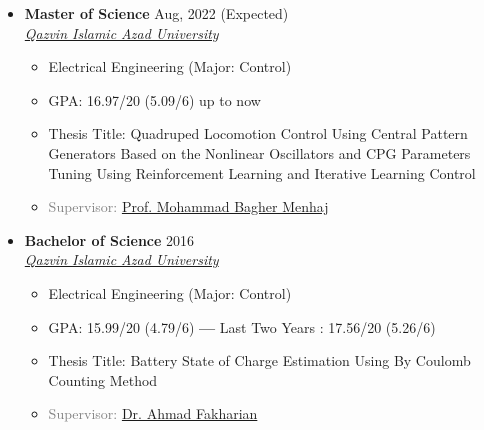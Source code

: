 \documentclass[10pt,a4paper,sans]{moderncv} %
\begin{document}
	\begin{itemize}[nosep]
		\item \textbf{Master of Science} \hfill Aug, 2022 (Expected)  \\ 
		\href{http://qiau.ac.ir/en/}{ \emph{Qazvin Islamic Azad University}} \hfill%
		
		\begin{itemize}[nosep, leftmargin=0.9cm ] %
			\item Electrical Engineering (Major: Control) %
	        \item GPA: 16.97/20 (5.09/6) up to now %
			\item Thesis Title: Quadruped Locomotion Control Using Central Pattern Generators Based on the Nonlinear Oscillators and CPG Parameters Tuning Using Reinforcement Learning and Iterative Learning Control %
			\item \textcolor{gray}{Supervisor: \href{https://scholar.google.com/citations?user=0EN-JbQAAAAJ}{Prof. Mohammad Bagher Menhaj}}
		\end{itemize}
		
		\vspace{1em}
		
		\item \textbf{Bachelor of Science} \hfill 2016 \\
		\href{http://qiau.ac.ir/en/}{ \emph{Qazvin Islamic Azad University}} \hfill %
		\begin{itemize}[nosep, leftmargin=0.9cm ]
			\item Electrical Engineering (Major: Control)
			\item GPA: 15.99/20 (4.79/6) %
			\textbf{---} Last Two Years : 17.56/20 (5.26/6) %
			\item Thesis Title: Battery State of Charge Estimation Using By Coulomb Counting Method %
			\item \textcolor{gray}{Supervisor: \href{https://scholar.google.com/citations?user=bI_eOLAAAAAJ}{Dr. Ahmad Fakharian}}
		\end{itemize}
	
	\end{itemize}
	
\end{document}
